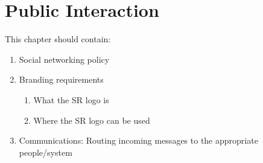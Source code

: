 \chapter{Public Interaction}

This chapter should contain:
\begin{enumerate}
\item Social networking policy
\item Branding requirements
  \begin{enumerate}
  \item What the SR logo is
  \item Where the SR logo can be used
  \end{enumerate}
\item Communications: Routing incoming messages to the appropriate people/system
\end{enumerate}
